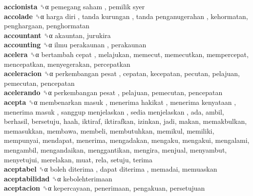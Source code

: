 \textbf{accionista} ␝α   pemegang saham ,  pemilik syer   \\
\textbf{accolade} ␝α   harga diri ,  tanda kurungan ,  tanda penganugerahan , kehormatan, penghargaan, penghormatan  \\
\textbf{accountant} ␝α  akauntan, jurukira  \\
\textbf{accounting} ␝α   ilmu perakaunan , perakaunan  \\
\textbf{acelera} ␝α   bertambah cepat , melajukan, memecut, memecutkan, mempercepat, mencepatkan, menyegerakan, percepatkan  \\
\textbf{aceleracion} ␝α   perkembangan pesat , cepatan, kecepatan, pecutan, pelajuan, pemecutan, pencepatan  \\
\textbf{acelerando} ␝α   perkembangan pesat , pelajuan, pemecutan, pencepatan  \\
\textbf{acepta} ␝α   membenarkan masuk ,  menerima hakikat ,  menerima kenyataan ,  menerima masuk ,  sanggup menjelaskan ,  sedia menjelaskan , ada, ambil, berhasil, bersetuju, haah, iktiraf, iktirafkan, izinkan, jadi, makan, memakbulkan, memasukkan, membawa, membeli, membutuhkan, memikul, memiliki, mempunyai, mendapat, menerima, mengadakan, mengaku, mengakui, mengalami, mengambil, mengandaikan, menggantikan, mengira, menjual, menyambut, menyetujui, merelakan, muat, rela, setuju, terima  \\
\textbf{aceptabel} ␝α   boleh diterima ,  dapat diterima , memadai, memuaskan  \\
\textbf{aceptabilidad} ␝α  kebolehterimaan  \\
\textbf{aceptacion} ␝α  kepercayaan, penerimaan, pengakuan, persetujuan  \\
